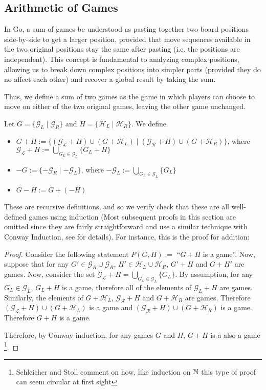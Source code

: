 \documentclass[../math194_paper.tex]{subfiles}
\begin{document}
\subsection{Arithmetic of Games} 

In Go, a sum of games be understood as pasting together two board positions side-by-side to 
get a larger position, provided that move sequences available in the two original positions 
stay the same after pasting (i.e. the positions are independent). This concept is fundamental 
to analyzing complex positions, allowing us to break down complex positions into simpler 
parts (provided they do no affect each other) and recover a global result by taking the sum.


Thus, we define a sum of two games as the game in which players
can choose to move on either of the two original games, leaving the other game unchanged.
\begin{definition} Let $G = \{\mathcal{G}_L \mid \mathcal{G}_R\}$
and  $H = \{\mathcal{H}_L \mid \mathcal{H}_R\}$. We define
\begin{itemize}
    \item $G + H := \{ (\mathcal{G_L} + H) \cup (G + \mathcal{H}_L) \mid (\mathcal{G_R} + H) \cup (G + \mathcal{H}_R)\}$, 
    where $\mathcal{G_L} + H := \bigcup_{G_L \in \mathcal{G}_L} \{G_L + H \}$
    \item $-G := \{-\mathcal{G}_R \mid -\mathcal{G}_L \}$, where 
    $-\mathcal{G}_L := \bigcup_{G_L \in \mathcal{G}_L} \{G_L \}$ 
    \item $G - H := G + (-H)$
\end{itemize}
\end{definition}
These are recursive definitions, and so we verify check that these are all well-defined 
games using induction (Most subsequent
proofs in this section are omitted since they are fairly straightforward and use 
a similar technique with Conway Induction, see \cite[\S 2]{schleicher2006introduction} for details).
For instance, this is the proof for addition:
\begin{proof}
    Consider the following statement  $P(G,H) :=$ ``$G + H$ is a game''. Now, suppose that for any 
    $G' \in \mathcal{G}_R \cup \mathcal{G}_R$, $H' \in \mathcal{H}_L \cup \mathcal{H}_R$,
    $G' + H$ and $G + H'$ are games. Now, consider the set $\mathcal{G_L} + H = \bigcup_{G_L \in \mathcal{G}_L} \{G_L \}$. By assumption, for any $G_L \in \mathcal{G}_L$, $G_L + H$ is a game, 
    therefore all of the elements of $\mathcal{G}_L + H$ are games. Similarly, the elements of 
    $G + \mathcal{H}_L$, $\mathcal{G_R} + H$ and $G + \mathcal{H}_R$ are games. Therefore 
    $(\mathcal{G_L} + H) \cup (G + \mathcal{H}_L)$ is a game and $(\mathcal{G_R} + H) \cup (G + \mathcal{H}_R)$ is a game. Therefore $G+H$ is a game. 
    
    Therefore, by Conway induction, for any games $G$ and $H$, $G+H$ is a also a game
    \footnote{Schleicher and Stoll comment on how, like induction on $\mathbb{N}$ 
    this type of proof can seem circular at first sight}.
\end{proof}
\end{document}
